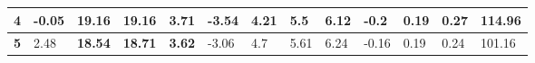 \documentclass[10pt,a4paper]{article}
\begin{document}
\begin{table}[]
\begin{tabular}{|l|llll|llll|llll|}
\textbf{4}  & \multicolumn{1}{l|}{{\color[HTML]{32CB00} \textbf{-0.05}}}                            & \multicolumn{1}{l|}{19.16}                                                             & \multicolumn{1}{l|}{19.16}                                                           & 3.71                                                                                             & \multicolumn{1}{l|}{-3.54}                                                            & \multicolumn{1}{l|}{{\color[HTML]{32CB00} \textbf{4.21}}}                              & \multicolumn{1}{l|}{5.5}                                                             & 6.12                                                                                             & \multicolumn{1}{l|}{-0.2}                                                             & \multicolumn{1}{l|}{0.19}                                                              & \multicolumn{1}{l|}{0.27}                                                            & 114.96                                                                                           \\ \hline
\textbf{5}  & \multicolumn{1}{l|}{2.48}                                                             & \multicolumn{1}{l|}{{\color[HTML]{32CB00} \textbf{18.54}}}                             & \multicolumn{1}{l|}{{\color[HTML]{32CB00} \textbf{18.71}}}                           & {\color[HTML]{32CB00} \textbf{3.62}}                                                             & \multicolumn{1}{l|}{-3.06}                                                            & \multicolumn{1}{l|}{4.7}                                                               & \multicolumn{1}{l|}{5.61}                                                            & 6.24                                                                                             & \multicolumn{1}{l|}{-0.16}                                                            & \multicolumn{1}{l|}{0.19}                                                              & \multicolumn{1}{l|}{0.24}                                                            & 101.16                                                                                           \\ \hline

\end{tabular}
\end{table}
\end{document}
